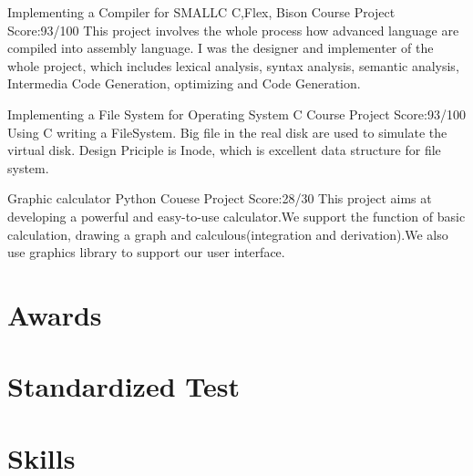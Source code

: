 \documentclass[11pt,a4paper]{moderncv}
\begin{document}
\vspace*{0.2\baselineskip}
{Implementing a Compiler for SMALLC}
{C,Flex, Bison}
{Course Project}
{Score:93/100}
{
This project involves the whole process how advanced language are compiled into assembly language.
I was the designer and implementer of the whole project, which includes lexical analysis, syntax analysis,
semantic analysis, Intermedia Code Generation, optimizing and Code Generation.\\
}

{Implementing a File System for Operating System}
{C}
{Course Project}
{Score:93/100}
{
Using C writing a FileSystem. Big file in the real disk are used to simulate the virtual disk. Design Priciple is Inode, which is excellent data structure for file system.\\
}


\vspace*{0.2\baselineskip}
{Graphic calculator}
{Python}
{Couese Project}
{Score:28/30}
{
This project aims at developing a powerful and easy-to-use calculator.We support the function of basic
calculation, drawing a graph and calculous(integration and derivation).We also use graphics library to support our user interface.\\
}

\section{Awards}

\section{Standardized Test}


\section{Skills}
\end{document}
